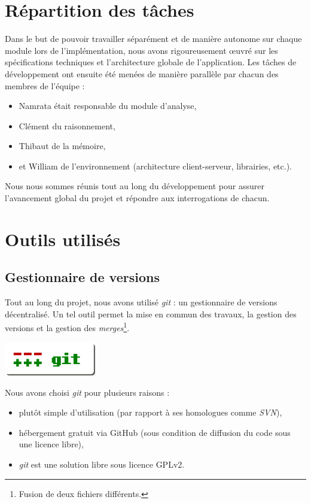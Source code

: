 \section{Répartition des tâches}

Dans le but de pouvoir travailler séparément et de manière autonome sur chaque module lors de l'implémentation, nous avons rigoureusement œuvré sur les spécifications techniques et l'architecture globale de l'application. Les tâches de développement ont ensuite été menées de manière parallèle par chacun des membres de l'équipe :

\begin{itemize}
\item Namrata était responsable du module d'analyse,
\item Clément du raisonnement,
\item Thibaut de la mémoire,
\item et William de l'environnement (architecture client-serveur, librairies, etc.).
\end{itemize}   

Nous nous sommes réunis tout au long du développement pour assurer l'avancement global du projet et répondre aux interrogations de chacun.

\section{Outils utilisés}

\subsection{Gestionnaire de versions}
Tout au long du projet, nous avons utilisé \emph{git} : un gestionnaire de versions décentralisé. Un tel outil permet la mise en commun des travaux, la gestion des versions et la gestion des \emph{merges}\footnote{Fusion de deux fichiers différents.}. 

\begin{center}
	\includegraphics[width=0.3\textwidth]{files/outils/git}	
\end{center}

Nous avons choisi \emph{git} pour plusieurs raisons :

\begin{itemize}
\item plutôt simple d'utilisation (par rapport à ses homologues comme \emph{SVN}),
\item hébergement gratuit via GitHub (sous condition de diffusion du code sous une licence libre),
\item \emph{git} est une solution libre sous licence \gls{GPLv2}.
\end{itemize}

